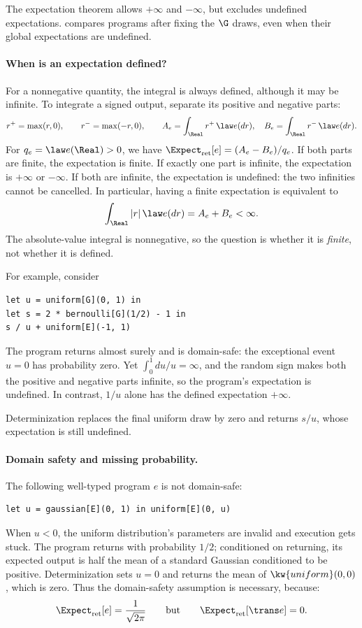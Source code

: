 The expectation theorem allows $+\infty$ and $-\infty$, but excludes undefined
expectations.  compares programs after fixing the $\G$ draws,
even when their global expectations are undefined.

\paragraph{When is an expectation defined?}
For a nonnegative quantity, the integral is always defined, although it may be
infinite. To integrate a signed output, separate its positive and negative parts:
\[
 r^+=\max(r,0),\qquad r^-=\max(-r,0),\qquad
 A_e=\int_{\Real}r^+\,\law e(dr),\quad
 B_e=\int_{\Real}r^-\,\law e(dr).
\]
For $q_e=\law e(\Real)>0$, we have
$\Expect_{\mathrm{ret}}[e]=(A_e-B_e)/q_e$.
If both parts are finite, the expectation is finite.
If exactly one part is infinite, the expectation is $+\infty$ or $-\infty$.
If both are infinite, the expectation is undefined: the two infinities cannot
be cancelled. In particular, having a finite expectation is equivalent to
\[
 \int_{\Real}|r|\,\law e(dr)=A_e+B_e<\infty.
\]
The absolute-value integral is nonnegative, so the question is whether it is
\emph{finite}, not whether it is defined.

For example, consider
\begin{lstlisting}
let u = uniform[G](0, 1) in
let s = 2 * bernoulli[G](1/2) - 1 in
s / u + uniform[E](-1, 1)
\end{lstlisting}
The program returns almost surely and is domain-safe: the exceptional event
$u=0$ has probability zero. Yet $\int_0^1 du/u=\infty$, and the random sign makes
both the positive and negative parts infinite, so the program's expectation is undefined. In contrast, $1/u$
alone has the defined expectation $+\infty$.

Determinization replaces the final uniform draw by zero and returns $s/u$,
whose expectation is still undefined.

\paragraph{Domain safety and missing probability.}
The following well-typed program $e$ is not domain-safe:
\begin{lstlisting}
let u = gaussian[E](0, 1) in uniform[E](0, u)
\end{lstlisting}
When $u<0$, the uniform distribution's parameters are invalid and execution gets
stuck. The program returns with probability $1/2$; conditioned on returning,
its expected output is half the mean of a standard Gaussian conditioned to be
positive. Determinization sets $u=0$ and returns the mean of
$\kw{uniform}(0,0)$, which is zero.
Thus the domain-safety assumption is necessary, because:
\[
 \Expect_{\mathrm{ret}}[e]=\frac{1}{\sqrt{2\pi}}
 \qquad\text{but}\qquad
 \Expect_{\mathrm{ret}}[\trans e]=0.
\]

